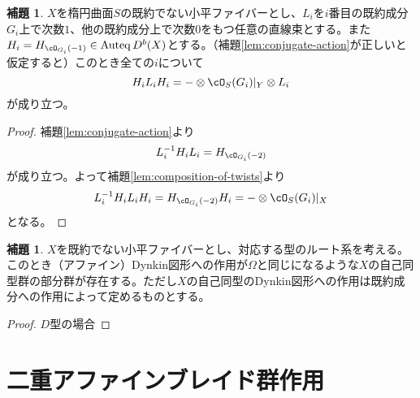 \documentclass[uplatex, a4paper, dvipdfmx]{jsarticle}
\theoremstyle{definition}
\newtheorem{lemma}[theorem]{補題}
\DeclareMathOperator{\Auteq}{\mathrm{Auteq}}
\begin{document}
\begin{lemma}
    $X$を楕円曲面$S$の既約でない小平ファイバーとし、$L_i$を$i$番目の既約成分$G_i$上で次数$1$、他の既約成分上で次数$0$をもつ任意の直線束とする。また$H_i = H_{\cO_{G_i}(-1)} \in \Auteq D^b(X)$とする。（補題\ref{lem:conjugate-action}が正しいと仮定すると）このとき全ての$i$について
    \begin{equation}
        H_iL_iH_i = -\otimes \cO_S(G_i)\vert_Y \otimes L_i
    \end{equation}
    が成り立つ。
\end{lemma}
\begin{proof}
    補題\ref{lem:conjugate-action}より
    \begin{equation}
        L_i^{-1}H_iL_i = H_{\cO_{G_i}(-2)}
    \end{equation}
    が成り立つ。よって補題\ref{lem:composition-of-twists}より
    \begin{equation}
        L_i^{-1}H_iL_iH_i = H_{\cO_{G_i}(-2)}H_i = -\otimes \cO_S(G_i)\vert_X
    \end{equation}
    となる。
\end{proof}
\begin{lemma}\label{lem:omega_in_automorphisms}
    $X$を既約でない小平ファイバーとし、対応する型のルート系を考える。このとき（アファイン）Dynkin図形への作用が$\Omega$と同じになるような$X$の自己同型群の部分群が存在する。ただし$X$の自己同型のDynkin図形への作用は既約成分への作用によって定めるものとする。
\end{lemma}
\begin{proof}
    $D$型の場合
\end{proof}


\section{二重アファインブレイド群作用}
\end{document}
